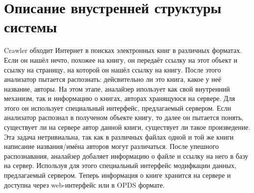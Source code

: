 \section{Описание внустренней структуры системы}
Crawler обходит Интернет в поисках электронных книг в различных форматах. Если он нашёл нечто, похожее на книгу, он передаёт ссылку на этот объект и ссылку на страницу, на которой он нашёл ссылку на книгу.
После этого анализатор пытается распознать: дейсвительно ли это книга, какое у неё название, авторы. На этом этапе, аналайзер ипользует как свой внутренний механизм, так и информацию о книгах, авторах хранящуюся на сервере. Для этого он использует специальный интерфейс, предлагаемый сервером.
Если анализатор распознал в полученом объекте книгу, то далее он пытается понять, существует ли на сервере автор данной книги, существует ли такое произведение. Эта задача нетривиальна, так как в различных файлах одной и той же книги написание названия/имёна авторов могут различаться.
После упешного распознавания, аналайзер добаляет информацию о файле и ссылку на него в базу на сервер. Используя для этого специальный интерфейс модифкации данных, предлагаемый сервером.
Теперь информация о книге хранится на сервере и доступна через web-интерфейс или в OPDS формате.


